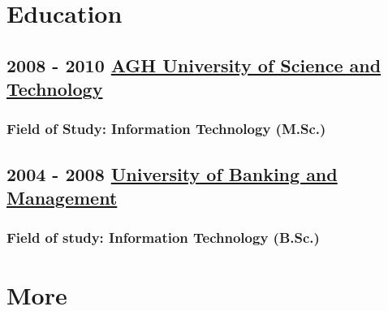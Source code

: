 \documentclass[a4paper]{article}
\begin{document}
\section*{\LARGE{Education\newline}} 
\subsection*{2008 - 2010 \href{http://www.agh.edu.pl/en/}{AGH University of Science and Technology}}
\subsubsection*{Field of Study: Information Technology (M.Sc.)\newline}
\subsection*{2004 - 2008 \href{http://www.wszib.edu.pl/index.php?change_lang=en}{University of Banking and Management}}
\subsubsection*{Field of study: Information Technology (B.Sc.)\newline} 

\section*{\LARGE{More\newline}}
\end{document}
